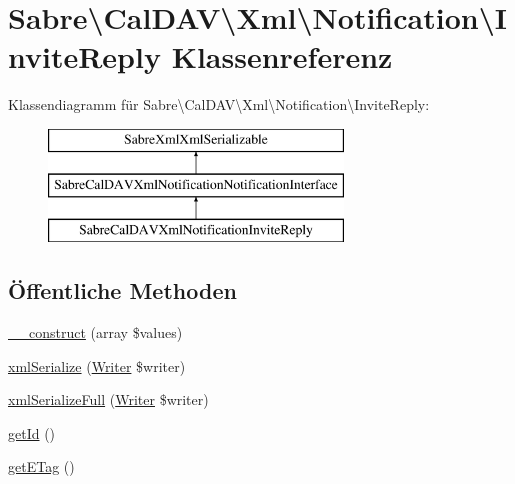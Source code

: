 \hypertarget{class_sabre_1_1_cal_d_a_v_1_1_xml_1_1_notification_1_1_invite_reply}{}\section{Sabre\textbackslash{}Cal\+D\+AV\textbackslash{}Xml\textbackslash{}Notification\textbackslash{}Invite\+Reply Klassenreferenz}
\label{class_sabre_1_1_cal_d_a_v_1_1_xml_1_1_notification_1_1_invite_reply}
Klassendiagramm für Sabre\textbackslash{}Cal\+D\+AV\textbackslash{}Xml\textbackslash{}Notification\textbackslash{}Invite\+Reply\+:\begin{figure}[H]
\begin{center}
\leavevmode
\includegraphics[height=3.000000cm]{class_sabre_1_1_cal_d_a_v_1_1_xml_1_1_notification_1_1_invite_reply}
\end{center}
\end{figure}
\subsection*{Öffentliche Methoden}
\begin{DoxyCompactItemize}
\item 
\mbox{\hyperlink{class_sabre_1_1_cal_d_a_v_1_1_xml_1_1_notification_1_1_invite_reply_aaeeb4229682b93f147bf576f23c9ef99}{\+\_\+\+\_\+construct}} (array \$values)
\item 
\mbox{\hyperlink{class_sabre_1_1_cal_d_a_v_1_1_xml_1_1_notification_1_1_invite_reply_a652400645af9418719cf085364eb4ace}{xml\+Serialize}} (\mbox{\hyperlink{class_sabre_1_1_xml_1_1_writer}{Writer}} \$writer)
\item 
\mbox{\hyperlink{class_sabre_1_1_cal_d_a_v_1_1_xml_1_1_notification_1_1_invite_reply_a19d655167f7347b67647479132df9b6b}{xml\+Serialize\+Full}} (\mbox{\hyperlink{class_sabre_1_1_xml_1_1_writer}{Writer}} \$writer)
\item 
\mbox{\hyperlink{class_sabre_1_1_cal_d_a_v_1_1_xml_1_1_notification_1_1_invite_reply_ac89488dcca33c99be046dae7bd85de53}{get\+Id}} ()
\item 
\mbox{\hyperlink{class_sabre_1_1_cal_d_a_v_1_1_xml_1_1_notification_1_1_invite_reply_a54973289592e7bc7ec95cc889e19d3e8}{get\+E\+Tag}} ()
\end{DoxyCompactItemize}
